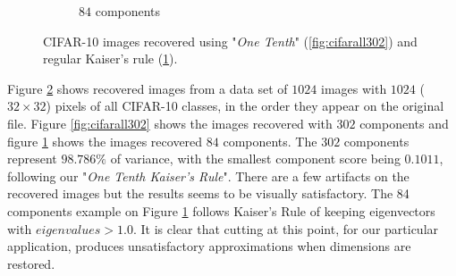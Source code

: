 \documentclass{article} %
\begin{document}
\begin{figure}[h]
\begin{subfigure}{.5\textwidth}
  \caption{$84$ components}
  \label{fig:cifarall84}
\end{subfigure}
\caption{CIFAR-10 images recovered using "\emph{One Tenth}" (\ref{fig:cifarall302}) and regular Kaiser's rule (\ref{fig:cifarall84}).}
\label{fig:sampleCifar10}
\end{figure}

Figure \ref{fig:sampleCifar10} shows recovered images from a data set of $1024$ images with $1024$ ($32\times 32$) pixels of all CIFAR-10 classes, in the order they appear on the original file. Figure \ref{fig:cifarall302} shows the images recovered with $302$ components and figure \ref{fig:cifarall84} shows the images recovered $84$ components. The $302$ components  represent $98.786\%$ of variance, with the smallest component score being $0.1011$, following our "\emph{One Tenth Kaiser's Rule}". There are a few artifacts on the recovered images but the results seems to be visually satisfactory. The 84 components example on Figure \ref{fig:cifarall84} follows Kaiser's Rule of keeping eigenvectors with $eigenvalues > 1.0$. It is clear that cutting at this point, for our particular application, produces unsatisfactory approximations when dimensions are restored.\par
\end{document}
